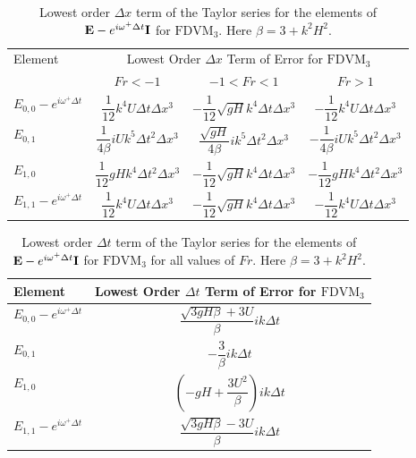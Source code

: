 \begin{table}
	\centering
	\begin{tabular}{l c c c}
		\hline
		Element & \multicolumn{3}{c}{Lowest Order $\Delta x$ Term of Error for $\text{FDVM}_3$} \T \B \\
		\cline{2-4} 
		& $Fr < -1$  & $-1 < Fr < 1$ & $Fr > 1$ \T \B \\
		\hline
		$E_{0,0} -  e^{i \omega^+ \Delta t} $& $\dfrac{1}{12} k^4 U \Delta t \Delta x^3$& $ - \dfrac{1}{12} \sqrt{gH} k^4 \Delta t\Delta x^3$ &  $ -\dfrac{1}{12} k^4 U \Delta t \Delta x^3$  \T \B  \\
		$E_{0,1}$& $\dfrac{1}{4 \beta}iUk^5 \Delta t^2 \Delta x^3 $  &$ \dfrac{\sqrt{gH}}{4 \beta}i k^5\Delta  t ^2\Delta x^3$ & $-\dfrac{1}{4 \beta}iUk^5 \Delta t^2 \Delta x^3 $  \T \B  \\
		$E_{1,0}$& $\dfrac{1}{12} gHk^4 \Delta t^2 \Delta x^3 $  &$ - \dfrac{1}{12} \sqrt{gH} k^4 \Delta t\Delta x^3$ & $-\dfrac{1}{12} gHk^4 \Delta t^2 \Delta x^3 $  \T \B \\
		$E_{1,1} -  e^{i \omega^+ \Delta t}$& $ \dfrac{1}{12} k^4 U \Delta t \Delta x^3$  &$ - \dfrac{1}{12} \sqrt{gH} k^4 \Delta t\Delta x^3$ & $ -\dfrac{1}{12} k^4 U \Delta t \Delta x^3$ \T \B  \\ 
		\hline
	\end{tabular}
	\caption{Lowest order $\Delta x$ term of the Taylor series for the elements of $\mathbf{E} - e^{i \omega^+ \Delta t} \mathbf{I}$ for $\text{FDVM}_3$. Here $\beta = 3 + k^2 H^2$.}
	\label{tab:EerrFDVM3dxerror} 
\end{table}
\begin{table}
	\centering
	\begin{tabular}{l  c}
		\hline
		Element & \multicolumn{1}{c}{Lowest Order $\Delta t$ Term of Error for $\text{FDVM}_3$} \T \B \\
		\hline  
		$E_{0,0} -  e^{i \omega^+ \Delta t} $ & $\dfrac{\sqrt{3gH \beta} + 3U}{\beta} ik \Delta t$ \T \B  \\
		$E_{0,1}$&  $ - \dfrac{3}{\beta} ik\Delta t$ \T \B   \\
		$E_{1,0}$&   $ \left(-gH + \dfrac{3U^2}{\beta}\right)ik \Delta t$ \T \B  \\
		$E_{1,1} -  e^{i \omega^+ \Delta t}$& $\dfrac{\sqrt{3gH \beta} - 3U}{\beta} ik \Delta t$ \T \B \\ 
		\hline
	\end{tabular}
	\caption{Lowest order $\Delta t$ term of the Taylor series for the elements of $\mathbf{E} - e^{i \omega^+ \Delta t} \mathbf{I}$ for $\text{FDVM}_3$ for all values of $Fr$. Here $\beta = 3 + k^2 H^2$.}
	\label{tab:EerrFDVM3dterror} 
\end{table}

